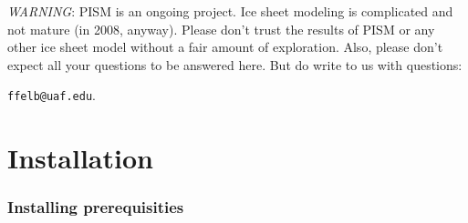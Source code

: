 \documentclass[11pt,final]{amsart}
\begin{document}
\vspace{1.5in}
\large
\begin{center}
 \emph{WARNING}:  PISM is an ongoing project.  Ice sheet modeling is complicated and not mature (in 2008, anyway).  Please don't trust the results of PISM or any other ice sheet model without a fair amount of exploration.  Also, please don't expect all your questions to be answered here.  But do write to us with questions: 

\verb|ffelb@uaf.edu|.
\end{center}
\normalsize

\newpage
\section{Installation}\label{sect:install}

\subsubsection*{Installing prerequisities}
\renewcommand{\labelenumi}{\textbf{\arabic{enumi}.}~}
\end{document}
